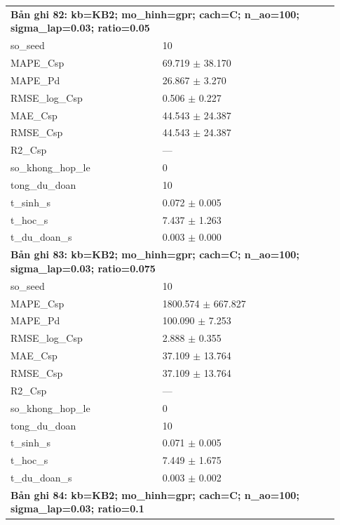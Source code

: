 \begin{longtable}{p{0.43\linewidth}p{0.50\linewidth}}
\midrule
\multicolumn{2}{p{0.95\linewidth}}{\textbf{Bản ghi 82: kb=KB2; mo\_hinh=gpr; cach=C; n\_ao=100; sigma\_lap=0.03; ratio=0.05}} \\
so\_\allowbreak seed & 10 \\
MAPE\_\allowbreak Csp & 69.719 $\pm$ 38.170 \\
MAPE\_\allowbreak Pd & 26.867 $\pm$ 3.270 \\
RMSE\_\allowbreak log\_\allowbreak Csp & 0.506 $\pm$ 0.227 \\
MAE\_\allowbreak Csp & 44.543 $\pm$ 24.387 \\
RMSE\_\allowbreak Csp & 44.543 $\pm$ 24.387 \\
R2\_\allowbreak Csp & — \\
so\_\allowbreak khong\_\allowbreak hop\_\allowbreak le & 0 \\
tong\_\allowbreak du\_\allowbreak doan & 10 \\
t\_\allowbreak sinh\_\allowbreak s & 0.072 $\pm$ 0.005 \\
t\_\allowbreak hoc\_\allowbreak s & 7.437 $\pm$ 1.263 \\
t\_\allowbreak du\_\allowbreak doan\_\allowbreak s & 0.003 $\pm$ 0.000 \\
\midrule
\multicolumn{2}{p{0.95\linewidth}}{\textbf{Bản ghi 83: kb=KB2; mo\_hinh=gpr; cach=C; n\_ao=100; sigma\_lap=0.03; ratio=0.075}} \\
so\_\allowbreak seed & 10 \\
MAPE\_\allowbreak Csp & 1800.574 $\pm$ 667.827 \\
MAPE\_\allowbreak Pd & 100.090 $\pm$ 7.253 \\
RMSE\_\allowbreak log\_\allowbreak Csp & 2.888 $\pm$ 0.355 \\
MAE\_\allowbreak Csp & 37.109 $\pm$ 13.764 \\
RMSE\_\allowbreak Csp & 37.109 $\pm$ 13.764 \\
R2\_\allowbreak Csp & — \\
so\_\allowbreak khong\_\allowbreak hop\_\allowbreak le & 0 \\
tong\_\allowbreak du\_\allowbreak doan & 10 \\
t\_\allowbreak sinh\_\allowbreak s & 0.071 $\pm$ 0.005 \\
t\_\allowbreak hoc\_\allowbreak s & 7.449 $\pm$ 1.675 \\
t\_\allowbreak du\_\allowbreak doan\_\allowbreak s & 0.003 $\pm$ 0.002 \\
\midrule
\multicolumn{2}{p{0.95\linewidth}}{\textbf{Bản ghi 84: kb=KB2; mo\_hinh=gpr; cach=C; n\_ao=100; sigma\_lap=0.03; ratio=0.1}} \\

\end{longtable}
